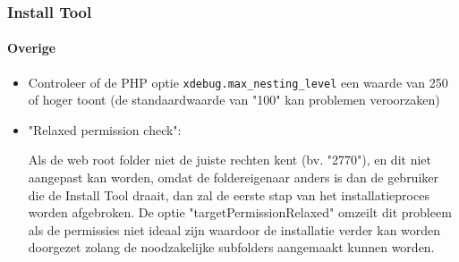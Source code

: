 \begin{frame}[fragile]
	\frametitle{Install Tool}
	\framesubtitle{Overige}

	\begin{itemize}
		\item Controleer of de PHP optie \texttt{xdebug.max\_nesting\_level} een waarde van 250 of hoger toont (de standaardwaarde van "100" kan problemen veroorzaken)
		\item "Relaxed permission check":

			\small
				Als de web root folder niet de juiste rechten kent (bv. "2770"),
				en dit niet aangepast kan worden, omdat de foldereigenaar anders is dan de gebruiker die de Install Tool draait, dan zal de eerste stap van het installatieproces worden afgebroken.
					De optie "targetPermissionRelaxed" omzeilt dit probleem als de permissies niet ideaal zijn waardoor de installatie verder kan worden doorgezet zolang de noodzakelijke subfolders aangemaakt kunnen worden.
			\normalsize



	\end{itemize}

\end{frame}


